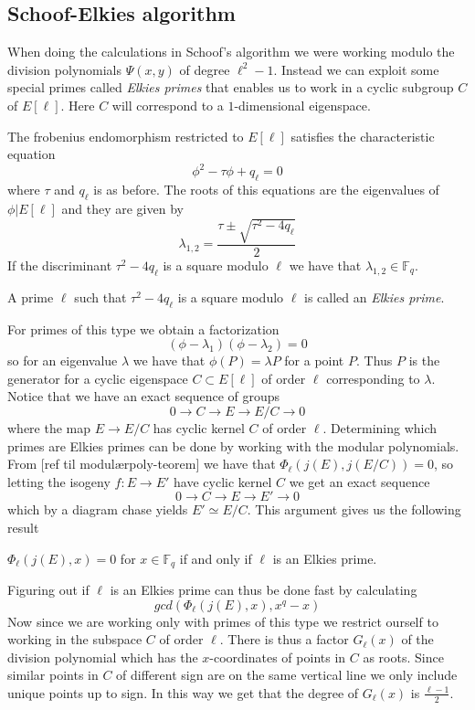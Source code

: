 \subsection{Schoof-Elkies algorithm}
When doing the calculations in Schoof's algorithm we were working modulo the division
polynomials $\Psi(x,y)$ of degree $\ell^2-1$. Instead we can exploit some special primes
called \emph{Elkies primes} that enables us to work in a cyclic subgroup $C$ of $E[\ell]$.
Here $C$ will correspond to a $1$-dimensional eigenspace.

The frobenius endomorphism restricted to $E[\ell]$ satisfies the characteristic equation
$$ \phi^2 - \tau \phi + q_\ell = 0 $$
where $\tau$ and $q_\ell$ is as before. The roots of this equations are the eigenvalues
of $\phi | E[\ell]$ and they are given by
$$ \lambda_{1,2} = \frac{\tau \pm \sqrt{\tau^2 - 4 q_\ell}}{2} $$
If the discriminant $\tau^2 - 4 q_\ell$ is a square modulo $\ell$ we have that
$\lambda_{1,2} \in \mathbb{F}_q$.
\begin{mydef}
A prime $\ell$ such that $\tau^2 - 4 q_\ell$ is a square modulo $\ell$ is called
an \emph{Elkies prime}.
\end{mydef}
For primes of this type we obtain a factorization
$$ (\phi - \lambda_1)(\phi - \lambda_2) = 0 $$
so for an eigenvalue $\lambda$ we have that $\phi(P) = \lambda P$ for a point $P$. Thus
$P$ is the generator for a cyclic eigenspace $C \subset E[\ell]$ of order $\ell$
corresponding to $\lambda$.
Notice that we have an exact sequence of groups
$$ 0 \rightarrow C \rightarrow E \rightarrow E/C \rightarrow 0 $$
where the map $E \rightarrow E/C$ has cyclic kernel $C$ of order $\ell$.
Determining which primes are Elkies primes can be done by working with the
modular polynomials. From [ref til modulærpoly-teorem] we have that $\Phi_\ell(j(E),j(E/C)) = 0$,
so letting the isogeny $f: E \rightarrow E'$ have cyclic kernel $C$ we get an exact
sequence
$$ 0 \rightarrow C \rightarrow E \rightarrow E' \rightarrow 0 $$
which by a diagram chase yields $ E' \simeq E/C $. This argument gives us the following result
\begin{prop}
 $ \Phi_\ell(j(E), x) = 0$ for $x \in \mathbb{F}_q$ if and only if $\ell$ is an Elkies
prime.
\end{prop}
Figuring out if $\ell$ is an Elkies prime can thus be done fast by calculating
$$gcd(\Phi_\ell(j(E), x), x^q - x)$$
Now since we are working only with primes of this type we restrict ourself to working
in the subspace $C$ of order $\ell$. There is thus a factor $G_\ell(x)$ of the division polynomial
which has the $x$-coordinates of points in $C$ as roots. Since
similar points in $C$ of different sign are on the same vertical line we only include
unique points up to sign. In this way we get that the degree of $G_\ell(x)$ is $\frac{\ell-1}{2}$.

